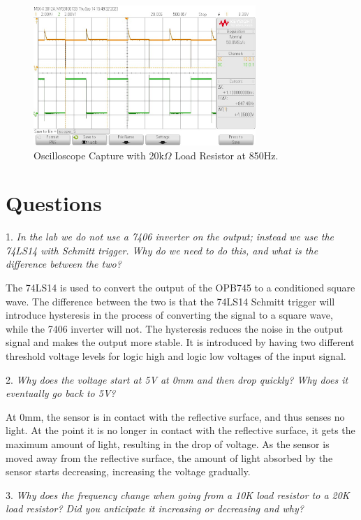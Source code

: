 \documentclass[CMPE]{KGCOEReport}
\begin{document}
\begin{figure}[H]
    \centering
    \includegraphics[width=0.75\textwidth]{output_max_20.png}
    \caption{Oscilloscope Capture with 20k$\Omega$ Load Resistor at 850Hz.}
    \label{fig:osc_20_max}
\end{figure}

\section*{Questions}

1. \emph{In the lab we do not use a 7406 inverter on the output; instead we use the 74LS14 with Schmitt trigger. Why do we need to do this, and what is the difference between the two?}

The 74LS14 is used to convert the output of the OPB745 to a conditioned square wave. The difference between the two is that the 74LS14 Schmitt trigger will introduce hysteresis in the process of converting the signal to a square wave, while the 7406 inverter will not. The hysteresis reduces the noise in the output signal and makes the output more stable. It is introduced by having two different threshold voltage levels for logic high and logic low voltages of the input signal.
\bigskip

2. \emph{Why does the voltage start at 5V at 0mm and then drop quickly? Why does it eventually go back to 5V?}

At 0mm, the sensor is in contact with the reflective surface, and thus senses no light. At the point it is no longer in contact with the reflective surface, it gets the maximum amount of light, resulting in the drop of voltage. As the sensor is moved away from the reflective surface, the amount of light absorbed by the sensor starts decreasing, increasing the voltage gradually.
\bigskip

3. \emph{Why does the frequency change when going from a 10K load resistor to a 20K load resistor? Did you anticipate it increasing or decreasing and why?}
\end{document}
